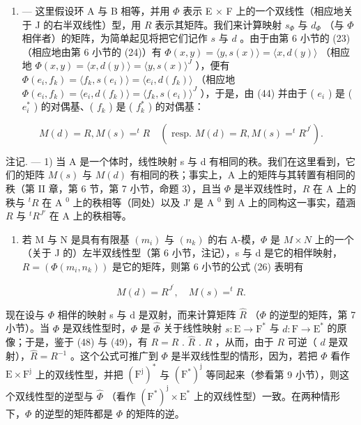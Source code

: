 \begin{enumerate}
\def\labelenumi{\Roman{enumi}.}
\setcounter{enumi}{3}
\tightlist
\item
  --- 这里假设环 A 与 B 相等，并用 \(\Phi\) 表示 E × F 上的一个双线性（相应地关于 J 的右半双线性）型，用 \(R\) 表示其矩阵。我们来计算映射 \(s_{\Phi}\) 与 \(d_{\Phi}\) （与 \(\Phi\) 相伴者）的矩阵，为简单起见将把它们记作 \(s\) 与 \(d\) 。由于由第 6 小节的 (23)（相应地由第 6 小节的 (24)）有 \(\Phi(x, y) = \langle y, s(x) \rangle = \langle x, d(y) \rangle\) （相应地 \(\Phi(x, y) = \langle x, d(y) \rangle = \langle y, s(x) \rangle^{J}\) ），便有 \(\Phi(e_i, f_k) = \langle f_k, s(e_i) \rangle = \langle e_i, d(f_k) \rangle\) （相应地 \(\Phi(e_i, f_k) = \langle e_i, d(f_k) \rangle = \langle f_k, s(e_i) \rangle^{J}\) ），于是，由 (44) 并由于 ( \(e_i\) ) 是 ( \(e_i^*\) ) 的对偶基、( \(f_k\) ) 是 ( \(f_k^*\) ) 的对偶基：
\end{enumerate}

\[
M (d) = R,   M (s) = ^ {t} R \quad (\text { resp. }   M (d) = R,   M (s) = ^ {t} R ^ {J ^ {\prime}}).\tag{49}
\]

注记. --- 1) 当 A 是一个体时，线性映射 s 与 d 有相同的秩。我们在这里看到，它们的矩阵 \(M(s)\) 与 \(M(d)\) 有相同的秩；事实上，A 上的矩阵与其转置有相同的秩（第 II 章，第 6 节，第 7 小节，命题 3），且当 \(\Phi\) 是半双线性时，\(R\) 在 A 上的秩与 \(^tR\) 在 A \(^0\) 上的秩相等（同处）以及 J′ 是 A \(^0\) 到 A 上的同构这一事实，蕴涵 \(R\) 与 \(^tR^{J'}\) 在 A 上的秩相等。

\begin{enumerate}
\def\labelenumi{\arabic{enumi})}
\setcounter{enumi}{1}
\tightlist
\item
  若 M 与 N 是具有有限基 \((m_{i})\) 与 \((n_{k})\) 的右 A-模，\(\Phi\) 是 \(M \times N\) 上的一个（关于 J 的）左半双线性型（第 6 小节，注记），s 与 d 是它的相伴映射，\(R = (\Phi(m_{i}, n_{k}))\) 是它的矩阵，则第 6 小节的公式 (26) 表明有
\end{enumerate}

\[
M (d) = R ^ {J ^ {\prime}}, \quad M (s) = ^ {t} R.
\]

现在设与 \(\Phi\) 相伴的映射 s 与 d 是双射，而来计算矩阵 \(\hat{R}\) （\(\Phi\) 的逆型的矩阵，第 7 小节）。当 \(\Phi\) 是双线性型时，\(\Phi\) 是 \(\hat{\Phi}\) 关于线性映射 \(s: \mathrm{E} \to \mathrm{F}^*\) 与 \(d: \mathrm{F} \to \mathrm{E}^*\) 的原像；于是，鉴于 (48) 与 (49)，有 \(R = R\) . \(\hat{R}\) . \(R\) ，从而，由于 \(R\) 可逆（ \(d\) 是双射），\(\hat{R} = R^{-1}\) 。这个公式可推广到 \(\Phi\) 是半双线性型的情形，因为，若把 \(\Phi\) 看作 \(\mathrm{E} \times \mathrm{F}^{\mathrm{j}}\) 上的双线性型，并把 \((\mathrm{F}^{\mathrm{j}})^{*}\) 与 \((\mathrm{F}^{*})^{\mathrm{j}}\) 等同起来（参看第 9 小节），则这个双线性型的逆型与 \(\hat{\Phi}\) （看作 \((\mathrm{F}^{*})^{\mathrm{j}} \times \mathrm{E}^{*}\) 上的双线性型）一致。在两种情形下，\(\Phi\) 的逆型的矩阵都是 \(\Phi\) 的矩阵的逆。

